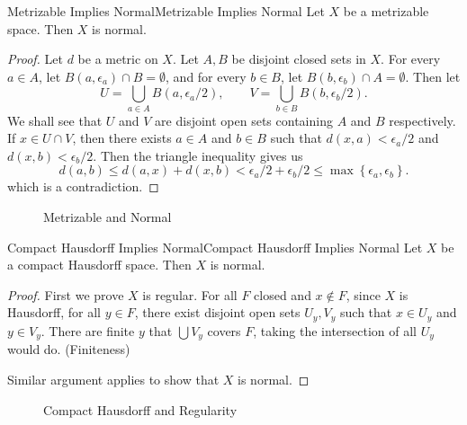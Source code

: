 \documentclass[../main.tex]{subfiles}
\begin{document}
\begin{theorem}{Metrizable Implies Normal}{Metrizable Implies Normal}
Let $X$ be a metrizable space. Then $X$ is normal.
\end{theorem}
\begin{proof}
	Let $d$ be a metric on $X$. Let $A,B$ be disjoint closed sets in $X$. For every $a\in A$, let $B(a,\epsilon_a)\cap B = \emptyset $, and for every $b\in B$, let $B(b,\epsilon_b)\cap A = \emptyset$. Then let
	\begin{equation*}
		U = \bigcup_{a\in A} B(a,\epsilon_a / 2), \qquad V = \bigcup_{b\in B} B(b,\epsilon_b / 2).
	\end{equation*}
	We shall see that $U$ and $V$ are disjoint open sets containing $A$ and $B$ respectively. If $x\in U\cap V$, then there exists $a\in A$ and $b\in B$ such that $d(x,a) < \epsilon_a / 2$ and $d(x,b) < \epsilon_b / 2$. Then the triangle inequality gives us
	\begin{equation*}
		d(a,b) \leq d(a,x) + d(x,b) < \epsilon_a / 2 + \epsilon_b / 2 \leq \max\left\{ \epsilon_a, \epsilon_b \right\}.
	\end{equation*}
	which is a contradiction.
\end{proof}

\begin{figure}[ht]
    \centering
    \caption{Metrizable and Normal}
    \label{fig:metrizable-and-normal}
\end{figure}

\begin{theorem}{Compact Hausdorff Implies Normal}{Compact Hausdorff Implies Normal}
Let $X$ be a compact Hausdorff space. Then $X$ is normal.
\end{theorem}
\begin{proof}
	First we prove $X$ is regular. For all $F$ closed and $x\notin F$, since $X$ is Hausdorff, for all $y\in F$, there exist disjoint open sets $U_y,V_y$ such that $x\in U_y$ and $y\in V_y$. There are finite $y$ that $\bigcup V_y $ covers $F$, taking the intersection of all $U_y$ would do. (Finiteness)

	Similar argument applies to show that $X$ is normal.
\end{proof}

\begin{figure}[ht]
    \centering
    \caption{Compact Hausdorff and Regularity}
    \label{fig:compact-hausdorff-and-regularity}
\end{figure}
\end{document}
